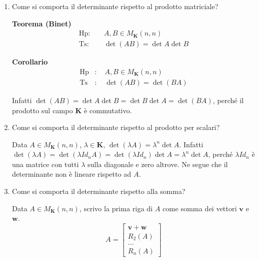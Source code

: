 \documentclass{article}
\begin{document}
\begin{enumerate}
\item Come si comporta il determinante rispetto al prodotto matriciale?

\textbf{Teorema (Binet)}%
\begin{eqnarray*}
\text{Hp}\text{: } &&A,B\in M_{\mathbf{K}}\left( n,n\right)  \\
\text{Ts}\text{: } &&\det \left( AB\right) =\det A\det B
\end{eqnarray*}

\textbf{Corollario}%
\begin{eqnarray*}
\text{Hp} &\text{: }&A,B\in M_{\mathbf{K}}\left( n,n\right) \\
\text{Ts} &\text{: }&\det \left( AB\right) =\det \left( BA\right)
\end{eqnarray*}

Infatti $\det \left( AB\right) =\det A\det B=\det B\det A=\det \left(
BA\right) $, perch\'{e} il prodotto sul campo $\mathbf{K}$ \`{e} commutativo.

\item Come si comporta il determinante rispetto al prodotto per scalari?

Data $A\in M_{\mathbf{K}}\left( n,n\right) $, $\lambda \in \mathbf{K}$, $%
\det \left( \lambda A\right) =\lambda ^{n}\det A$. Infatti $\det \left(
\lambda A\right) =\det \left( \lambda Id_{n}A\right) =\det \left( \lambda
Id_{n}\right) \det A=\lambda ^{n}\det A$, perch\'{e} $\lambda Id_{n}$ \`{e}
una matrice con tutti $\lambda $ sulla diagonale e zero altrove. Ne segue
che il determinante non \`{e} lineare rispetto ad $A$.

\item Come si comporta il determinante rispetto alla somma?

Data $A\in M_{\mathbf{K}}\left( n,n\right) $, scrivo la prima riga di $A$
come somma dei vettori $\mathbf{v}$ e $\mathbf{w}$.%
\begin{equation*}
A=\left[ 
\begin{array}{c}
\mathbf{v+w} \\ 
R_{2}\left( A\right) \\ 
... \\ 
R_{n}\left( A\right)%
\end{array}%
\right]
\end{equation*}


\end{enumerate}
\end{document}
